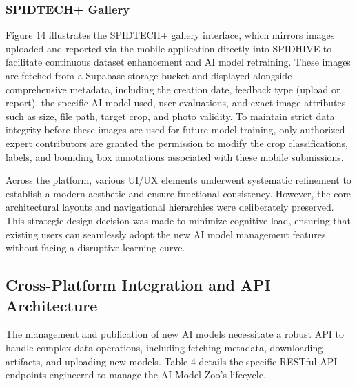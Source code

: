 \documentclass[journal]{./IEEE/IEEEtran}
\begin{document}
\subsubsection{SPIDTECH+ Gallery}
Figure 14 illustrates the SPIDTECH+ gallery interface, which mirrors images uploaded and reported via the mobile application directly into SPIDHIVE to facilitate continuous dataset enhancement and AI model retraining. These images are fetched from a Supabase storage bucket and displayed alongside comprehensive metadata, including the creation date, feedback type (upload or report), the specific AI model used, user evaluations, and exact image attributes such as size, file path, target crop, and photo validity. To maintain strict data integrity before these images are used for future model training, only authorized expert contributors are granted the permission to modify the crop classifications, labels, and bounding box annotations associated with these mobile submissions.

Across the platform, various UI/UX elements underwent systematic refinement to establish a modern aesthetic and ensure functional consistency. However, the core architectural layouts and navigational hierarchies were deliberately preserved. This strategic design decision was made to minimize cognitive load, ensuring that existing users can seamlessly adopt the new AI model management features without facing a disruptive learning curve.

\subsection{Cross-Platform Integration and API Architecture}
The management and publication of new AI models necessitate a robust API to handle complex data operations, including fetching metadata, downloading artifacts, and uploading new models. Table 4 details the specific RESTful API endpoints engineered to manage the AI Model Zoo's lifecycle.
\end{document}
